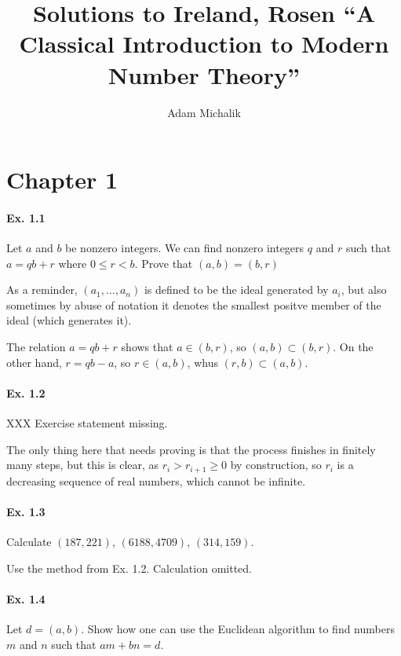 \documentclass[notitlepage]{article}
\title{Solutions to Ireland, Rosen ``A Classical Introduction to Modern Number Theory''}
\author{Adam Michalik}
\theoremstyle{definition}
\begin{document}
\maketitle
\section{Chapter 1}

\paragraph{Ex. 1.1}

Let $a$ and $b$ be nonzero integers. We can find nonzero integers $q$
and $r$ such that $a = qb + r$ where $0 \leq r < b$. Prove that $(a, b) = (b, r)$

As a reminder, $(a_1, \ldots, a_n)$ is defined to be the ideal
generated by $a_i$, but also sometimes by abuse of notation it denotes
the smallest positve member of the ideal (which generates it).

The relation $a = qb + r$ shows that $a \in (b, r)$, so $(a, b) \subset (b, r)$.
On the other hand, $r = qb - a$, so $r \in (a, b)$, whus $(r, b) \subset (a, b)$.

\paragraph{Ex. 1.2}

XXX Exercise statement missing.

The only thing here that needs proving is that the process finishes in
finitely many steps, but this is clear, as $r_i > r_{i+1} \geq 0$ by
construction, so $r_i$ is a decreasing sequence of real numbers, which
cannot be infinite.

\paragraph{Ex. 1.3}

Calculate $(187, 221)$, $(6188, 4709)$, $(314, 159)$.

Use the method from Ex. 1.2. Calculation omitted.

\paragraph{Ex. 1.4}

Let $d = (a, b)$. Show how one can use the Euclidean algorithm to find
numbers $m$ and $n$ such that $am + bn = d$.
\end{document}
